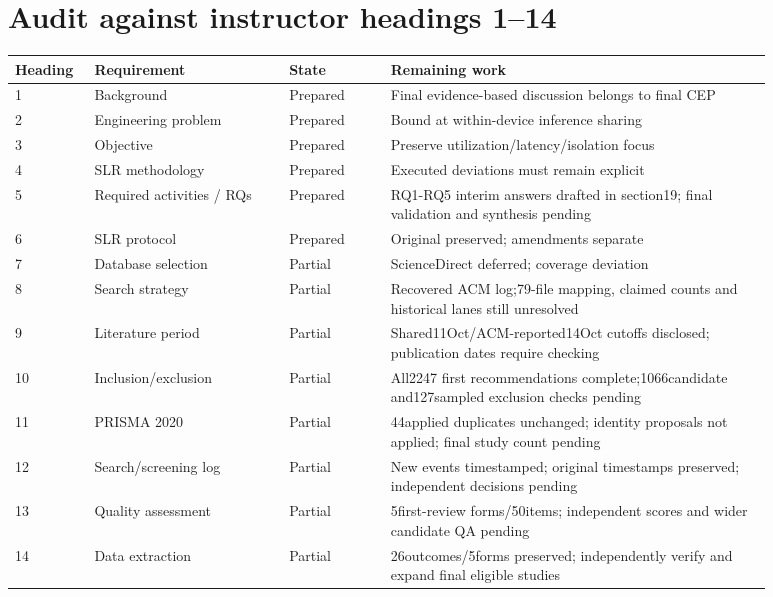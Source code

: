 \section{Audit against instructor headings 1--14}\begin{longtable}{p{0.08\linewidth}p{0.23\linewidth}p{0.12\linewidth}p{0.45\linewidth}}
\toprule
Heading & Requirement & State & Remaining work\\\midrule
\endhead
1 & Background & Prepared & Final evidence-based discussion belongs to final CEP\\
2 & Engineering problem & Prepared & Bound at within-device inference sharing\\
3 & Objective & Prepared & Preserve utilization/\allowbreak{}latency/\allowbreak{}isolation focus\\
4 & SLR methodology & Prepared & Executed deviations must remain explicit\\
5 & Required activities /\allowbreak{} RQs & Prepared & RQ1-RQ5 interim answers drafted in section19; final validation and synthesis pending\\
6 & SLR protocol & Prepared & Original preserved; amendments separate\\
7 & Database selection & Partial & ScienceDirect deferred; coverage deviation\\
8 & Search strategy & Partial & Recovered ACM log;79-file mapping, claimed counts and historical lanes still unresolved\\
9 & Literature period & Partial & Shared11Oct/\allowbreak{}ACM-reported14Oct cutoffs disclosed; publication dates require checking\\
10 & Inclusion/\allowbreak{}exclusion & Partial & All2247 first recommendations complete;1066candidate and127sampled exclusion checks pending\\
11 & PRISMA 2020 & Partial & 44applied duplicates unchanged; identity proposals not applied; final study count pending\\
12 & Search/\allowbreak{}screening log & Partial & New events timestamped; original timestamps preserved; independent decisions pending\\
13 & Quality assessment & Partial & 5first-review forms/\allowbreak{}50items; independent scores and wider candidate QA pending\\
14 & Data extraction & Partial & 26outcomes/\allowbreak{}5forms preserved; independently verify and expand final eligible studies\\
\bottomrule
\end{longtable}
